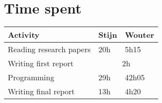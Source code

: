\section{Time spent}

\begin{center}
\label{my-label}
\begin{tabular}{|l|l|l|}
\hline
Activity                & Stijn      & Wouter     \\ \hline
Reading research papers & 20h        & 5h15       \\ \hline
Writing first report    & \multicolumn{2}{c|}{2h} \\ \hline
Programming             & 29h        & 42h05      \\ \hline
Writing final report    & 13h        & 4h20       \\ \hline
\end{tabular}
\end{center}